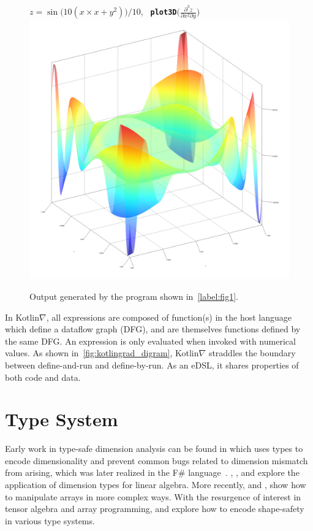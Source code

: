 \documentclass{article}
\begin{document}
\begin{figure}[!htb]
              \centering $z = \sin{\big(10(x \times x + y^2)\big)} / 10$, \textbf{\texttt{ plot3D}}$\Big(\frac{\partial^3z}{\partial{x^2}\partial{y}}\Big)$
              \includegraphics[scale=0.43]{../figures/../figures/plot_result.png}
              \caption{Output generated by the program shown in~\autoref{label:fig1}.}
\end{figure}

In Kotlin$\nabla$, all expressions are composed of function(s) in the host language which define a dataflow graph (DFG), and are themselves functions defined by the same DFG. An expression is only evaluated when invoked with numerical values. As shown in~\autoref{fig:kotlingrad_digram}, Kotlin$\nabla$ straddles the boundary between define-and-run and define-by-run. As an eDSL, it shares properties of both code and data.

\section{Type System}

Early work in type-safe dimension analysis can be found in \citet{kennedy1994dimension, kennedy1996programming} which uses types to encode dimensionality and prevent common bugs related to dimension mismatch from arising, which was later realized in the F\# language~\citep{kennedy2010types}. \citet{jay1996shape}, \citet{rittri1995dimension}, and \citet{zenger1997indexed} explore the application of dimension types for linear algebra. More recently, \citet{kiselyov2005number, kiselyov2010fun} and \citet{griffioen2015type}, show how to manipulate arrays in more complex ways. With the resurgence of interest in tensor algebra and array programming, \citet{chen2017typesafe} and \citet{rink2018modeling} explore how to encode shape-safety in various type systems.
\end{document}
